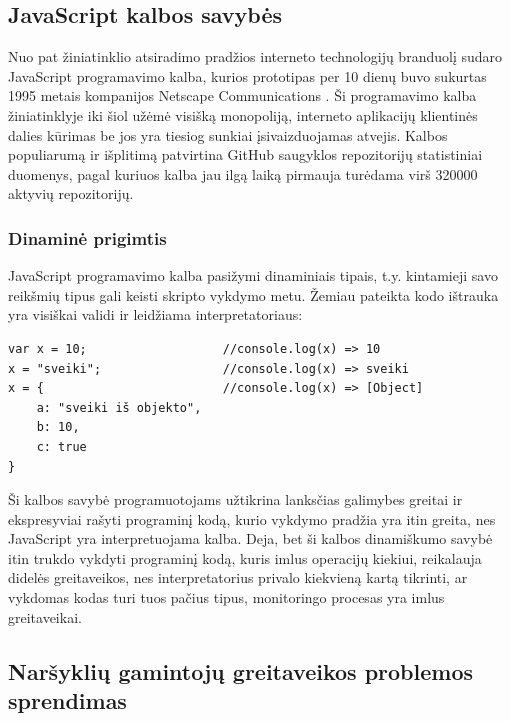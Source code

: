 \documentclass{VUMIFPSkursinis}
\begin{document}
\subsection{JavaScript kalbos savybės}

Nuo pat žiniatinklio atsiradimo pradžios interneto technologijų branduolį sudaro JavaScript programavimo kalba, kurios prototipas per 10 dienų buvo sukurtas 1995 metais kompanijos Netscape Communications \cite{Ast15}. Ši programavimo kalba žiniatinklyje iki šiol užėmė visišką monopoliją, interneto aplikacijų klientinės dalies kūrimas be jos yra tiesiog sunkiai įsivaizduojamas atvejis. Kalbos populiarumą ir išplitimą patvirtina GitHub saugyklos repozitorijų statistiniai duomenys, pagal kuriuos kalba jau ilgą laiką pirmauja turėdama virš 320000 aktyvių repozitorijų. \cite{GIT19}

\subsubsection{Dinaminė prigimtis}

JavaScript programavimo kalba pasižymi dinaminiais tipais, t.y. kintamieji savo reikšmių tipus gali keisti skripto vykdymo metu. Žemiau pateikta kodo ištrauka yra visiškai validi ir leidžiama interpretatoriaus:

\begin{center}
\begin{small}
\begin{verbatim}
var x = 10;                   //console.log(x) => 10
x = "sveiki";                 //console.log(x) => sveiki
x = {                         //console.log(x) => [Object]
    a: "sveiki iš objekto",
    b: 10,
    c: true
}
\end{verbatim}
\end{small}
\end{center}

Ši kalbos savybė programuotojams užtikrina lanksčias galimybes greitai ir ekspresyviai rašyti programinį kodą, kurio vykdymo pradžia yra itin greita, nes JavaScript yra interpretuojama kalba. Deja, bet ši kalbos dinamiškumo savybė itin trukdo vykdyti programinį kodą, kuris imlus operacijų kiekiui, reikalauja didelės greitaveikos, nes interpretatorius privalo kiekvieną kartą tikrinti, ar vykdomas kodas turi tuos pačius tipus, monitoringo procesas yra imlus greitaveikai. \cite{Cla17}

\subsection{Naršyklių gamintojų greitaveikos problemos sprendimas}
\end{document}
